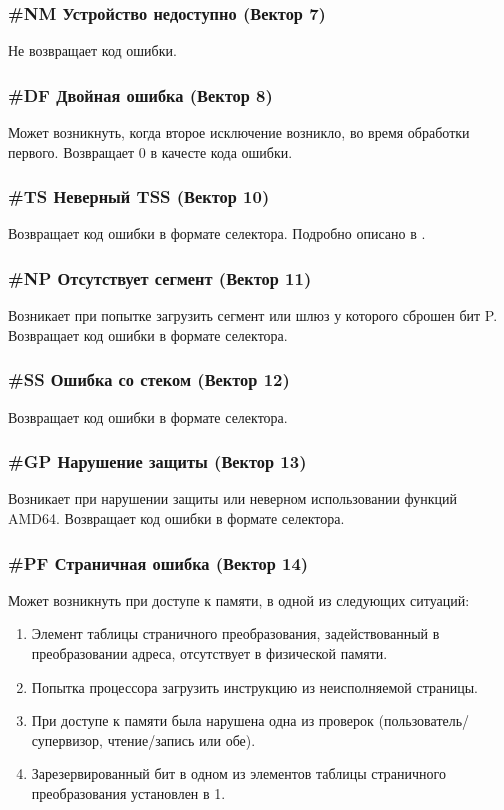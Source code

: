 \subsubsection*{\#NM Устройство недоступно (Вектор 7)}
Не возвращает код ошибки.

\subsubsection*{\#DF Двойная ошибка (Вектор 8)}
Может возникнуть, когда второе исключение возникло, во время обработки
первого. Возвращает 0 в качесте кода ошибки.

\subsubsection*{\#TS Неверный TSS (Вектор 10)}
Возвращает код ошибки в формате селектора. Подробно описано в \cite[стр. 222]{amd_pm_v2}.

\subsubsection*{\#NP Отсутствует сегмент (Вектор 11)}
Возникает при попытке загрузить сегмент или шлюз у которого сброшен бит P.
Возвращает код ошибки в формате селектора.

\subsubsection*{\#SS Ошибка со стеком (Вектор 12)}
Возвращает код ошибки в формате селектора.

\subsubsection*{\#GP Нарушение защиты (Вектор 13)}
Возникает при нарушении защиты или неверном использовании функций AMD64.
Возвращает код ошибки в формате селектора.

\subsubsection*{\#PF Страничная ошибка (Вектор 14)}
Может возникнуть при доступе к памяти, в одной из следующих ситуаций:
\begin{enumerate}
\item Элемент таблицы страничного преобразования, задействованный в
преобразовании адреса, отсутствует в физической памяти.
\item Попытка процессора загрузить инструкцию из неисполняемой страницы.
\item При доступе к памяти была нарушена одна из проверок
(пользователь/супервизор, чтение/запись или обе).
\item Зарезервированный бит в одном из элементов таблицы страничного
преобразования установлен в 1.
\end{enumerate}

